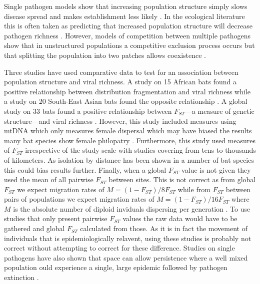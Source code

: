 



Single pathogen models show that increasing population structure simply slows disease spread and makes establishment less likely \cite{colizza2007invasion, vespignani2008reaction}.
In the ecological literature this is often taken as predicting that increased population structure will decrease pathogen richness \cite{nunn2003comparative, morand2000wormy, poulin2014parasite, poulin2000diversity, altizer2003social}.
However, models of competition between multiple pathogens show that in unstructured populations a competitive exclusion process occurs but that splitting the population into two patches allows coexistence \cite{qiu2013vector,allen2004sis, nunes2006localized}.



Three studies have used comparative data to test for an association between population structure and viral richness.
A study on 15 African bats found a positive relationship between distribution fragmentation and viral richness \cite{maganga2014bat} while a study on 20 South-East Asian bats found the opposite relationship \cite{gay2014parasite}. 
A global study on 33 bats found a positive relationship between $F_{ST}$---a measure of genetic structure---and viral richness \cite{turmelle2009correlates}. 
However, this study included measures using mtDNA which only measures female dispersal which may have biased the results many bat species show female philopatry \cite{kerth2002extreme, hulva2010mechanisms}.
Furthermore, this study used measures of $F_{ST}$ irrespective of the study scale with studies covering from tens \cite{mccracken1981social} to thousands \cite{petit1999male} of kilometers.
As isolation by distance has been shown in a number of bat species \cite{burland1999population, hulva2010mechanisms, o2015genetic, vonhof2015range} this could bias results further.
Finally, when a global $F_{ST}$ value is not given they used the mean of all pairwise $F_{ST}$ between sites.
This is not correct as from global $F_{ST}$ we expect migration rates of $M = (1-F_{ST})/8F_{ST}$ while from $F_{ST}$ between pairs of populations we expect migration rates of $M = (1-F_{ST})/16F_{ST}$ where $M$ is the absolute number of diploid inviduals dispersing per generation \cite{slatkin1995measure}.
To use studies that only present pairwise $F_{ST}$ values the raw data would have to be gathered and global $F_{ST}$ calculated from those.
As it is in fact the movement of individuals that is epidemiologically relavent, using these studies is probably not correct without attempting to correct for these difference.
Studies on single pathogens have also shown that space can allow persistence where a well mixed population ould experience a single, large epidemic followed by pathogen extinction \cite{blackwood2013resolving, pons2014insights, plowright2011urban}.


